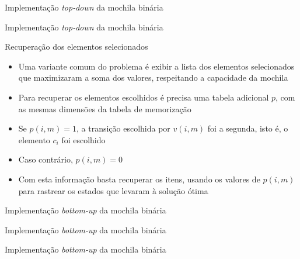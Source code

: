 \begin{frame}[fragile]{Implementação {\it top-down} da mochila binária}
\end{frame}

\begin{frame}[fragile]{Implementação {\it top-down} da mochila binária}
\end{frame}

\begin{frame}[fragile]{Recuperação dos elementos selecionados}

    \begin{itemize}
        \item Uma variante comum do problema é exibir a lista dos elementos selecionados
            que maximizaram a soma dos valores, respeitando a capacidade da mochila

        \item Para recuperar os elementos escolhidos é precisa uma tabela adicional $p$, com
            as mesmas dimensões da tabela de memorização

        \item Se $p(i, m) = 1$, a transição escolhida por $v(i, m)$ foi a segunda, isto é,
            o elemento $c_i$ foi escolhido

        \item Caso contrário, $p(i, m) = 0$

        \item Com esta informação basta recuperar os itens, usando os valores de $p(i, m)$
            para rastrear os estados que levaram à solução ótima
    \end{itemize}

\end{frame}

\begin{frame}[fragile]{Implementação {\it bottom-up} da mochila binária}
\end{frame}

\begin{frame}[fragile]{Implementação {\it bottom-up} da mochila binária}
\end{frame}

\begin{frame}[fragile]{Implementação {\it bottom-up} da mochila binária}
\end{frame}
